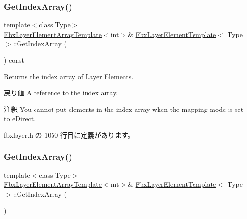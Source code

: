 \subsubsection{\texorpdfstring{Get\+Index\+Array()}{GetIndexArray()}\hspace{0.1cm}{\footnotesize\ttfamily [1/2]}}
{\footnotesize\ttfamily template$<$class Type$>$ \\
\hyperlink{class_fbx_layer_element_array_template}{Fbx\+Layer\+Element\+Array\+Template}$<$int$>$\& \hyperlink{class_fbx_layer_element_template}{Fbx\+Layer\+Element\+Template}$<$ Type $>$\+::Get\+Index\+Array (\begin{DoxyParamCaption}{ }\end{DoxyParamCaption}) const\hspace{0.3cm}{\ttfamily [inline]}}

Returns the index array of Layer Elements. \begin{DoxyReturn}{戻り値}
A reference to the index array. 
\end{DoxyReturn}
\begin{DoxyRemark}{注釈}
You cannot put elements in the index array when the mapping mode is set to e\+Direct. 
\end{DoxyRemark}


 fbxlayer.\+h の 1050 行目に定義があります。

\mbox{\label{class_fbx_layer_element_template_a299f160a392be9be520df2d0a1275fc8}} 
\subsubsection{\texorpdfstring{Get\+Index\+Array()}{GetIndexArray()}\hspace{0.1cm}{\footnotesize\ttfamily [2/2]}}
{\footnotesize\ttfamily template$<$class Type$>$ \\
\hyperlink{class_fbx_layer_element_array_template}{Fbx\+Layer\+Element\+Array\+Template}$<$int$>$\& \hyperlink{class_fbx_layer_element_template}{Fbx\+Layer\+Element\+Template}$<$ Type $>$\+::Get\+Index\+Array (\begin{DoxyParamCaption}{ }\end{DoxyParamCaption})\hspace{0.3cm}{\ttfamily [inline]}}

